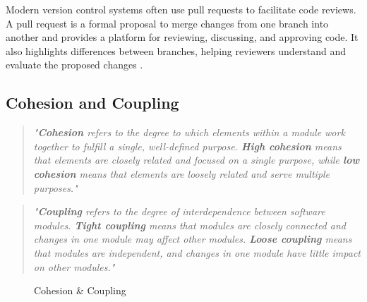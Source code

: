 Modern version control systems often use pull requests to facilitate code reviews. A pull request is a formal proposal to merge changes from one branch into another and provides a platform for reviewing, discussing, and approving code. It also highlights differences between branches, helping reviewers understand and evaluate the proposed changes \cite{github:pr}.

\subsection{Cohesion and Coupling}
\label{subsec:cohesion-and-coupling}

\begin{quote}
\textit{"\textbf{Cohesion} refers to the degree to which elements within a module work together to fulfill a single, well-defined purpose. \textbf{High cohesion} means that elements are closely related and focused on a single purpose, while \textbf{low cohesion} means that elements are loosely related and serve multiple purposes."} \cite{geeksforgeeks:c&c} \\
\end{quote}

\begin{quote}
\textit{"\textbf{Coupling} refers to the degree of interdependence between software modules. \textbf{Tight coupling} means that modules are closely connected and changes in one module may affect other modules. \textbf{Loose coupling} means that modules are independent, and changes in one module have little impact on other modules."} \cite{geeksforgeeks:c&c} \\
\end{quote}

\begin{figure}[h!]
    \centering

    \caption[Cohesion \& Coupling]{Cohesion \& Coupling \cite{geeksforgeeks:c&c}}
    \label{fig:cohesion-coupling}
\end{figure}

